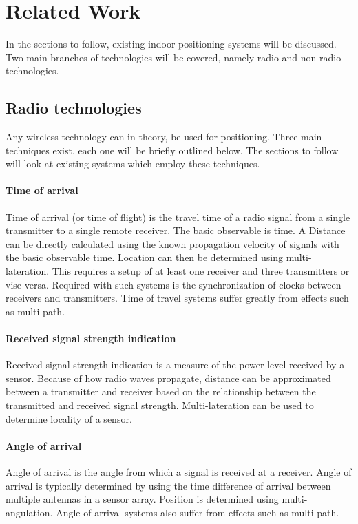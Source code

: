 \documentclass[11pt,a4paper]{article}
\begin{document}
\newpage
\section{Related Work}
	In the sections to follow, existing indoor positioning systems will be discussed. Two main branches of technologies will be covered, namely radio and non-radio technologies.
	
	\subsection{Radio technologies}
		Any wireless technology can in theory, be used for positioning. Three main techniques exist, each one will be briefly outlined below. The sections to follow will look at existing systems which employ these techniques.
	
	\paragraph{Time of arrival}
		Time of arrival (or time of flight) is the travel time of a radio signal from a single transmitter to a single remote receiver. The basic observable is time. A Distance can be directly calculated using the known propagation velocity of signals with the basic observable time. Location can then be determined using multi-lateration. This requires a setup of at least one receiver and three transmitters or vise versa.
		Required with such systems is the synchronization of clocks between receivers and transmitters.
		Time of travel systems suffer greatly from effects such as multi-path.
		\cite{k._pahlavan_wideband_1998}
	
	\paragraph{Received signal strength indication}
		Received signal strength indication is a measure of the power level received by a sensor. Because of how radio waves propagate, distance can be approximated between a transmitter and receiver based on the relationship between the transmitted and received signal strength. Multi-lateration can be used to determine locality of a sensor.
	
	\paragraph{Angle of arrival}
		Angle of arrival is the angle from which a signal is received at a receiver. Angle of arrival is typically determined by using the time difference of arrival between multiple antennas in a sensor array. Position is determined using multi-angulation.
		Angle of arrival systems also suffer from effects such as multi-path.
	
\end{document}
